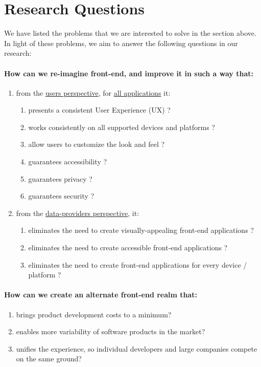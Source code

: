 
\section{Research Questions} \label{researchQuestions}

We have listed the problems that we are interested to solve in the section above. In light of these problems, we aim to answer the following questions in our research:

\paragraph{How can we re-imagine front-end, and improve it in such a way that:}
\begin{enumerate}
  \item from the \underline{users perspective}, for \underline{all applications} it:
  \begin{enumerate}
    \item presents a consistent User Experience (UX) ?
    \item works consistently on all supported devices and platforms ?
    \item allow users to customize the look and feel ?
    \item guarantees accessibility ?
    \item guarantees privacy ?
    \item guarantees security ?
  \end{enumerate}
  \item from the \underline{data-providers perspective}, it:
  \begin{enumerate}
    \item eliminates the need to create visually-appealing front-end applications ?
    \item eliminates the need to create accessible front-end applications ?
    \item eliminates the need to create front-end applications for every device / platform ?
  \end{enumerate}
\end{enumerate}

\paragraph{How can we create an alternate front-end realm that:}
\begin{enumerate}
  \item brings product development costs to a minimum?
  \item enables more variability of software products in the market?
  \item unifies the experience, so individual developers and large companies compete on the same ground?
\end{enumerate}
